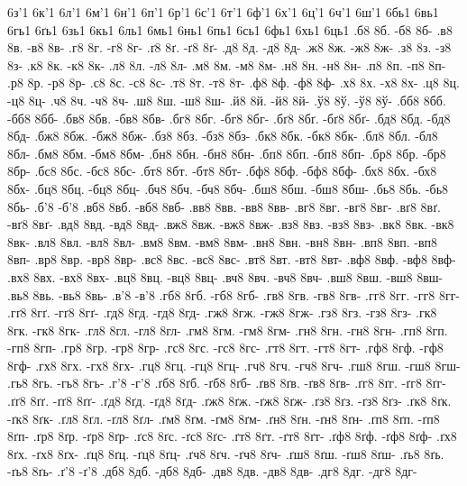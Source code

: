 {6з'1
6к'1
6л'1
6м'1
6н'1
6п'1
6р'1
6с'1
6т'1
6ф'1
6х'1
6ц'1
6ч'1
6ш'1
6бь1
6вь1
6гь1
6ґь1
6зь1
6кь1
6ль1
6мь1
6нь1
6пь1
6сь1
6фь1
6хь1
6ць1
%
%
.б8 8б. -б8 8б-
.в8 8в. -в8 8в-
.г8 8г. -г8 8г-
.ґ8 8ґ. -ґ8 8ґ-
.д8 8д. -д8 8д-
.ж8 8ж. -ж8 8ж-
.з8 8з. -з8 8з-
.к8 8к. -к8 8к-
.л8 8л. -л8 8л-
.м8 8м. -м8 8м-
.н8 8н. -н8 8н-
.п8 8п. -п8 8п-
.р8 8р. -р8 8р-
.с8 8с. -с8 8с-
.т8 8т. -т8 8т-
.ф8 8ф. -ф8 8ф-
.х8 8х. -х8 8х-
.ц8 8ц. -ц8 8ц-
.ч8 8ч. -ч8 8ч-
.ш8 8ш. -ш8 8ш-
.й8 8й. -й8 8й-
.ў8 8ў. -ў8 8ў-
.бб8 8бб. -бб8 8бб-
.бв8 8бв. -бв8 8бв-
.бг8 8бг. -бг8 8бг-
.бґ8 8бґ. -бґ8 8бґ-
.бд8 8бд. -бд8 8бд-
.бж8 8бж. -бж8 8бж-
.бз8 8бз. -бз8 8бз-
.бк8 8бк. -бк8 8бк-
.бл8 8бл. -бл8 8бл-
.бм8 8бм. -бм8 8бм-
.бн8 8бн. -бн8 8бн-
.бп8 8бп. -бп8 8бп-
.бр8 8бр. -бр8 8бр-
.бс8 8бс. -бс8 8бс-
.бт8 8бт. -бт8 8бт-
.бф8 8бф. -бф8 8бф-
.бх8 8бх. -бх8 8бх-
.бц8 8бц. -бц8 8бц-
.бч8 8бч. -бч8 8бч-
.бш8 8бш. -бш8 8бш-
.бь8 8бь. -бь8 8бь-
.б'8 -б'8
.вб8 8вб. -вб8 8вб-
.вв8 8вв. -вв8 8вв-
.вг8 8вг. -вг8 8вг-
.вґ8 8вґ. -вґ8 8вґ-
.вд8 8вд. -вд8 8вд-
.вж8 8вж. -вж8 8вж-
.вз8 8вз. -вз8 8вз-
.вк8 8вк. -вк8 8вк-
.вл8 8вл. -вл8 8вл-
.вм8 8вм. -вм8 8вм-
.вн8 8вн. -вн8 8вн-
.вп8 8вп. -вп8 8вп-
.вр8 8вр. -вр8 8вр-
.вс8 8вс. -вс8 8вс-
.вт8 8вт. -вт8 8вт-
.вф8 8вф. -вф8 8вф-
.вх8 8вх. -вх8 8вх-
.вц8 8вц. -вц8 8вц-
.вч8 8вч. -вч8 8вч-
.вш8 8вш. -вш8 8вш-
.вь8 8вь. -вь8 8вь-
.в'8 -в'8
.гб8 8гб. -гб8 8гб-
.гв8 8гв. -гв8 8гв-
.гг8 8гг. -гг8 8гг-
.гґ8 8гґ. -гґ8 8гґ-
.гд8 8гд. -гд8 8гд-
.гж8 8гж. -гж8 8гж-
.гз8 8гз. -гз8 8гз-
.гк8 8гк. -гк8 8гк-
.гл8 8гл. -гл8 8гл-
.гм8 8гм. -гм8 8гм-
.гн8 8гн. -гн8 8гн-
.гп8 8гп. -гп8 8гп-
.гр8 8гр. -гр8 8гр-
.гс8 8гс. -гс8 8гс-
.гт8 8гт. -гт8 8гт-
.гф8 8гф. -гф8 8гф-
.гх8 8гх. -гх8 8гх-
.гц8 8гц. -гц8 8гц-
.гч8 8гч. -гч8 8гч-
.гш8 8гш. -гш8 8гш-
.гь8 8гь. -гь8 8гь-
.г'8 -г'8
.ґб8 8ґб. -ґб8 8ґб-
.ґв8 8ґв. -ґв8 8ґв-
.ґг8 8ґг. -ґг8 8ґг-
.ґґ8 8ґґ. -ґґ8 8ґґ-
.ґд8 8ґд. -ґд8 8ґд-
.ґж8 8ґж. -ґж8 8ґж-
.ґз8 8ґз. -ґз8 8ґз-
.ґк8 8ґк. -ґк8 8ґк-
.ґл8 8ґл. -ґл8 8ґл-
.ґм8 8ґм. -ґм8 8ґм-
.ґн8 8ґн. -ґн8 8ґн-
.ґп8 8ґп. -ґп8 8ґп-
.ґр8 8ґр. -ґр8 8ґр-
.ґс8 8ґс. -ґс8 8ґс-
.ґт8 8ґт. -ґт8 8ґт-
.ґф8 8ґф. -ґф8 8ґф-
.ґх8 8ґх. -ґх8 8ґх-
.ґц8 8ґц. -ґц8 8ґц-
.ґч8 8ґч. -ґч8 8ґч-
.ґш8 8ґш. -ґш8 8ґш-
.ґь8 8ґь. -ґь8 8ґь-
.ґ'8 -ґ'8
.дб8 8дб. -дб8 8дб-
.дв8 8дв. -дв8 8дв-
.дг8 8дг. -дг8 8дг-
}
